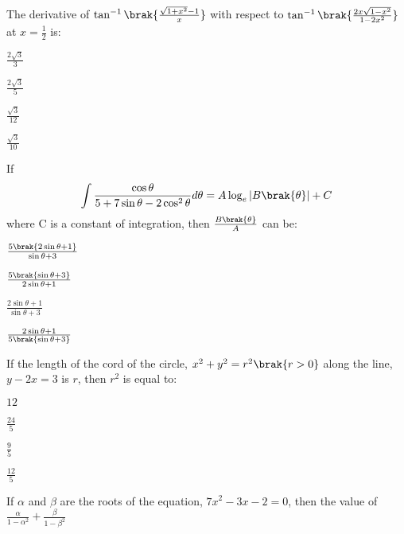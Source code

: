      \item The derivative of $\tan^{-1}\brak{\frac{\sqrt{1+x^{2}}-1}{x}}$ with respect to $\tan^{-1}\brak{\frac{2x\sqrt{1-x^{2}}}{1-2x^{2}}}$ at $x=\frac{1}{2}$ is:
     \begin{enumerate}
     \begin{multicols}{4}
     \item $\frac{ 2 \sqrt{3}}{3}$
     \item $\frac{2\sqrt{3}}{5}$
     \item $\frac{\sqrt{3}}{12}$
     \item $\frac{\sqrt{3}}{10}$
     \end{multicols}
      \end{enumerate}
      \item If 
	      \begin{align}
		      \int \frac{\cos\theta}{5+7\sin\theta-2\cos^{2}\theta}d\theta= A\log_{e}|B\brak{\theta}|+C
	      \end{align}
	      where C is a constant of integration, then $\frac{B\brak{\theta}}{A}$ can be:
      \begin{enumerate}
      \begin{multicols}{4}
      \item $\frac{5\brak{2\sin\theta+1}}{\sin\theta+3}$
      \item $\frac{5\brak{\sin\theta+3}}{2\sin\theta+1}$
       \item $\frac{2\sin\theta+1}{\sin\theta+3}$
       \item $\frac{2\sin\theta+1}{5\brak{\sin\theta+3}}$
      \end{multicols}
      \end{enumerate}
      \item If the length of the cord of the circle, $x^{2}+y^{2}=r^{2}\brak{r>0}$ along the line, $y-2x=3$ is $r$, then $r^{2}$ is equal to:
      \begin{enumerate}
      \begin{multicols}{4}
      \item $12$
      \item $\frac{24}{5}$
      \item $\frac{9}{5}$
      \item $\frac{12}{5}$
      \end{multicols}
      \end{enumerate}
      \item If $\alpha$ and $\beta$ are the roots of the equation, $7x^{2}-3x-2=0$, then the value of$\frac{\alpha}{1-\alpha^{2}} +\frac{\beta}{1-\beta^{2}}$
